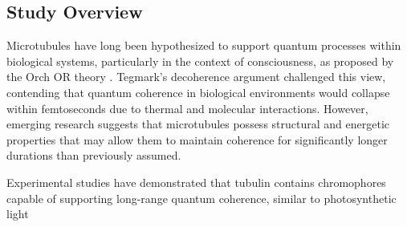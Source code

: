 \documentclass[entropy,article,submit,oneauthor,pdftex]{Definitions/mdpi}
\begin{document}
\subsection{Study Overview}
Microtubules have long been hypothesized to support quantum processes within biological systems, particularly in the context of consciousness, as proposed by the Orch OR theory \cite{hameroff_orchestrated_1996,nanopoulos_quantum_1995}. Tegmark's decoherence argument \cite{tegmark_importance_2000} challenged this view, contending that quantum coherence in biological environments would collapse within femtoseconds due to thermal and molecular interactions. However, emerging research suggests that microtubules possess structural and energetic properties that may allow them to maintain coherence for significantly longer durations than previously assumed.

Experimental studies have demonstrated that tubulin contains chromophores capable of supporting long-range quantum coherence, similar to photosynthetic light
\end{document}
